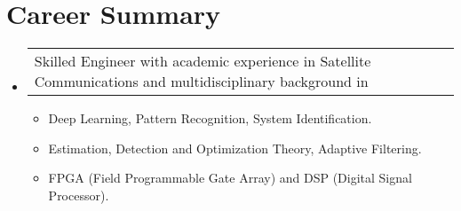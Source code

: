 \section{Career Summary}

\begin{itemize}[leftmargin=0.15in, label={}] %
    \item   \begin{tabular*}{0.2\textwidth}{l} Skilled Engineer with academic experience in Satellite Communications and multidisciplinary background in \end{tabular*}\vspace{-7pt} %
            \begin{itemize} %
                \item{Deep Learning, Pattern Recognition, System Identification. \vspace{-2pt}} %
                \item{Estimation, Detection and Optimization Theory, Adaptive Filtering. \vspace{-2pt}} %
                \item{FPGA (Field Programmable Gate Array) and DSP (Digital Signal Processor). \vspace{-2pt}} %
            \end{itemize}\vspace{-5pt}
\end{itemize} %
